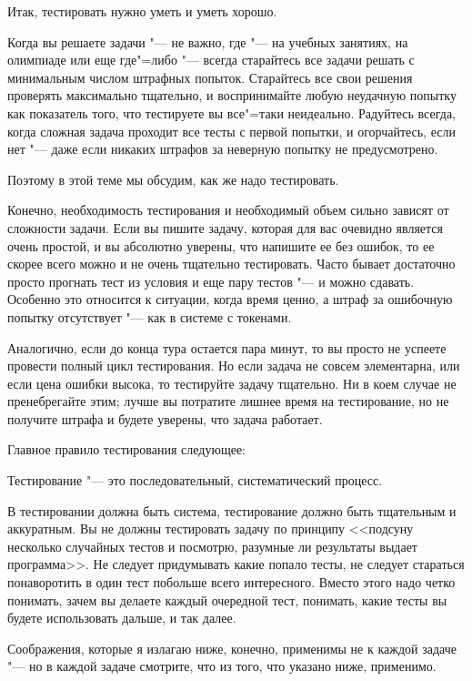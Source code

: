 \documentclass[a4paper,10pt]{problems}
\begin{document}
Итак, тестировать нужно уметь и уметь хорошо.

Когда вы решаете задачи "--- не важно, где "--- на учебных занятиях, на олимпиаде или еще где"=либо "--- всегда старайтесь все задачи решать с минимальным числом штрафных попыток. Старайтесь все свои решения проверять максимально тщательно, и воспринимайте любую неудачную попытку как показатель того, что тестируете вы все"=таки неидеально. Радуйтесь всегда, когда сложная задача проходит все тесты с первой попытки, и огорчайтесь, если нет "--- даже если никаких штрафов за неверную попытку не предусмотрено.

Поэтому в этой теме мы обсудим, как же надо тестировать.

Конечно, необходимость тестирования и необходимый объем сильно зависят от сложности задачи. 
Если вы пишите задачу, которая для вас очевидно является очень простой, и вы абсолютно уверены, что напишите ее без ошибок, 
то ее скорее всего можно и не очень тщательно тестировать. 
Часто бывает достаточно просто прогнать тест из условия и еще пару тестов "--- и можно сдавать. 
Особенно это относится к ситуации, когда время ценно, а штраф за ошибочную попытку отсутствует "--- как в системе с токенами.

Аналогично, если до конца тура остается пара минут, то вы просто не успеете провести полный цикл тестирования. 
Но если задача не совсем элементарна, или если цена ошибки высока, то тестируйте задачу тщательно. Ни в коем случае не пренебрегайте этим; 
лучше вы потратите лишнее время на тестирование, но не получите штрафа и будете уверены, что задача работает.

Главное правило тестирования следующее:

\begin{framed}
Тестирование "--- это последовательный, систематический процесс.
\end{framed}

В тестировании должна быть система, тестирование должно быть тщательным и аккуратным. 
Вы не должны тестировать задачу по принципу <<подсуну несколько случайных тестов и посмотрю, разумные ли результаты выдает программа>>. 
Не следует придумывать какие попало тесты, не следует стараться понаворотить в один тест побольше всего интересного. 
Вместо этого надо четко понимать, зачем вы делаете каждый очередной тест, понимать, какие тесты вы будете использовать дальше, и так далее.

Соображения, которые я излагаю ниже, конечно, применимы не к каждой задаче "--- но в каждой задаче смотрите, что из того, что указано ниже, применимо.
\end{document}

